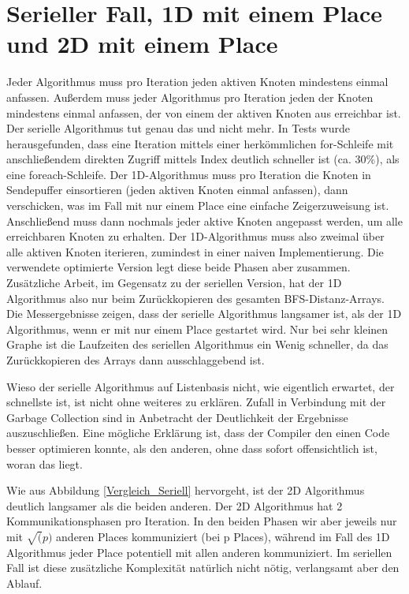 \section{Serieller Fall, 1D mit einem Place und 2D mit einem Place} %
\label{sec:serieller_fall_vs_1d_mit_einem_place}
Jeder Algorithmus muss pro Iteration jeden aktiven Knoten mindestens einmal anfassen. Außerdem muss jeder Algorithmus pro Iteration jeden der Knoten mindestens einmal anfassen, der von einem der aktiven Knoten aus erreichbar ist. Der serielle Algorithmus tut genau das und nicht mehr. In Tests wurde herausgefunden, dass eine Iteration mittels einer herkömmlichen for-Schleife mit anschließendem direkten Zugriff mittels Index deutlich schneller ist (ca. 30\%), als eine foreach-Schleife. Der 1D-Algorithmus muss pro Iteration die Knoten in Sendepuffer einsortieren (jeden aktiven Knoten einmal anfassen), dann verschicken, was im Fall mit nur einem Place eine einfache Zeigerzuweisung ist. Anschließend muss dann nochmals jeder aktive Knoten angepasst werden, um alle erreichbaren Knoten zu erhalten. Der 1D-Algorithmus muss also zweimal über alle aktiven Knoten iterieren, zumindest in einer naiven Implementierung. Die verwendete optimierte Version legt diese beide Phasen aber zusammen. Zusätzliche Arbeit, im Gegensatz zu der seriellen Version, hat der 1D Algorithmus also nur beim Zurückkopieren des gesamten BFS-Distanz-Arrays. Die Messergebnisse zeigen, dass der serielle Algorithmus langsamer ist, als der 1D Algorithmus, wenn er mit nur einem Place gestartet wird. Nur bei sehr kleinen Graphe ist die Laufzeiten des seriellen Algorithmus ein Wenig schneller, da das Zurückkopieren des Arrays dann ausschlaggebend ist.

Wieso der serielle Algorithmus auf Listenbasis nicht, wie eigentlich erwartet, der schnellste ist, ist nicht ohne weiteres zu erklären. Zufall in Verbindung mit der Garbage Collection sind in Anbetracht der Deutlichkeit der Ergebnisse auszuschließen. Eine mögliche Erklärung ist, dass der Compiler den einen Code besser optimieren konnte, als den anderen, ohne dass sofort offensichtlich ist, woran das liegt.

Wie aus Abbildung \ref{Vergleich_Seriell} hervorgeht, ist der 2D Algorithmus deutlich langsamer als die beiden anderen. Der 2D Algorithmus hat 2 Kommunikationsphasen pro Iteration. In den beiden Phasen wir aber jeweils nur mit $\sqrt(p)$ anderen Places kommuniziert (bei p Places)\cite{Buluc:2011}, während im Fall des 1D Algorithmus jeder Place potentiell mit allen anderen kommuniziert. Im seriellen Fall ist diese zusätzliche Komplexität natürlich nicht nötig, verlangsamt aber den Ablauf.

